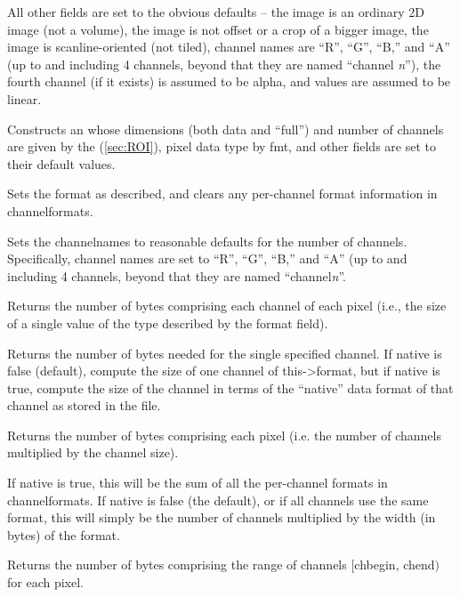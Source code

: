 All other fields are set to the obvious defaults -- the image is an
ordinary 2D image (not a volume), the image is not offset or a crop of a
bigger image, the image is scanline-oriented (not tiled), channel names
are ``R'', ``G'', ``B,'' and ``A'' (up to and including 4 channels,
beyond that they are named ``channel \emph{n}''), the fourth channel (if
it exists) is assumed to be alpha, and values are assumed to be linear.
\apiend

Constructs an \ImageSpec whose dimensions (both data and ``full'') and
number of channels are given by the \ROI (\ref{sec:ROI}), pixel data type
by {\cf fmt}, and other fields are set to their default values.
\apiend

Sets the format as described, and clears any per-channel format information
in {\cf channelformats}.
\apiend

Sets the {\cf channelnames} to reasonable defaults for the number of
channels.  Specifically, channel names are set to ``R'', ``G'', ``B,''
and ``A'' (up to and including 4 channels, beyond that they are named
``channel\emph{n}''.
\apiend

Returns the number of bytes comprising each channel of each pixel (i.e.,
the size of a single value of the type described by the {\cf format} field).
\apiend

Returns the number of bytes needed for the single specified
channel.  If native is {\cf false} (default), compute the size of one
channel of {\cf this->format}, but if native is {\cf true}, compute the size
of the channel in terms of the ``native'' data format of that
channel as stored in the file.
\apiend

Returns the number of bytes comprising each pixel (i.e. the number of
channels multiplied by the channel size).

If {\cf native} is true, this will be the sum of all the per-channel
formats in {\cf channelformats}.  If {\cf native} is false (the
default), or if all channels use the same format, this will simply be
the number of channels multiplied by the width (in bytes) of the {\cf format}.
\apiend

Returns the number of bytes comprising the range of channels 
  $[${\cf chbegin}, {\cf chend}$)$ for each pixel.

